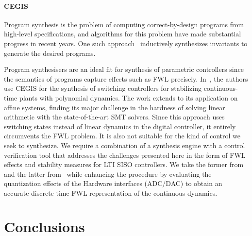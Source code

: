 \documentclass[final]{sig-alternate-05-2015}
\begin{document}
\paragraph{CEGIS}

Program synthesis is the problem of computing correct-by-design programs
from high-level specifications, and algorithms for this problem have made
substantial progress in recent years.  One such
approach~\cite{itzhaky2010simple} inductively synthesizes invariants to
generate the desired programs.

Program synthesisers are an ideal fit for synthesis of parametric
controllers since the semantics of programs capture effects such as FWL
precisely.  In~\cite{DBLP:conf/cdc/RavanbakhshS15}, the authors use CEGIS
for the synthesis of switching controllers for stabilizing continuous-time
plants with polynomial dynamics.  The work extends to its application on
affine systems, finding its major challenge in the hardness of solving
linear arithmetic with the state-of-the-art SMT solvers.  Since this
approach uses switching states instead of linear dynamics in the digital
controller, it entirely circumvents the FWL problem.  It is also not
suitable for the kind of control we seek to synthesize.  We require a
combination of a synthesis engine with a control verification tool that
addresses the challenges presented here in the form of FWL effects and
stability measures for LTI SISO controllers.  We take the former
from~\cite{DBLP:conf/lpar/DavidKL15} and the latter from~\cite{daes20161}
while enhancing the procedure by evaluating the quantization effects of the
Hardware interfaces (ADC/DAC) to obtain an accurate discrete-time FWL
representation of the continuous dynamics.
 

\section{Conclusions} \label{sec:conclusions}
\end{document}
